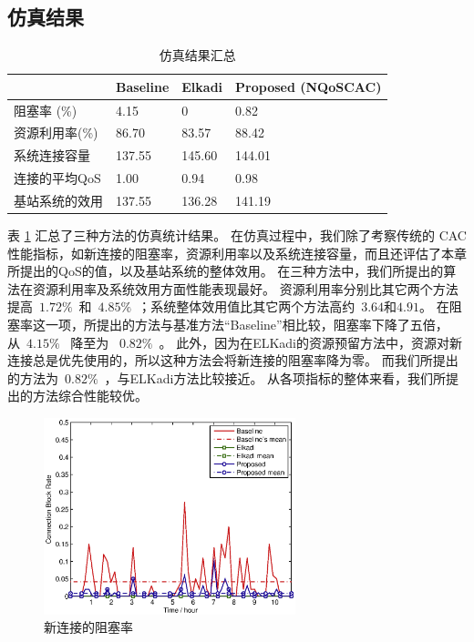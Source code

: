 \subsection{仿真结果} 
%
\begin{table}[htbp] 
\caption{仿真结果汇总} \label{tb:chap_cacop:res_sim}
\begin{center}
\wuhao
\begin{tabularx}{0.99\textwidth}{XXXX}
\toprule
&Baseline &Elkadi &Proposed (NQoSCAC)\\
\midrule
阻塞率 (\%) &4.15 & 0 &0.82\\
资源利用率(\%) &86.70 &83.57 &88.42\\
系统连接容量 &137.55 &145.60 &144.01\\
连接的平均QoS &1.00 &0.94 &0.98\\
基站系统的效用 &137.55 &136.28 &141.19\\
\bottomrule
\end{tabularx}
\end{center}
\end{table}
表 \ref{tb:chap_cacop:res_sim} 汇总了三种方法的仿真统计结果。
在仿真过程中，我们除了考察传统的 CAC 性能指标，如新连接的阻塞率，资源利用率以及系统连接容量，而且还评估了本章所提出的QoS的值，以及基站系统的整体效用。
在三种方法中，我们所提出的算法在资源利用率及系统效用方面性能表现最好。
资源利用率分别比其它两个方法提高~$1.72\%$~和~$4.85\%$~；系统整体效用值比其它两个方法高约~$3.64$和$4.91$。
在阻塞率这一项，所提出的方法与基准方法“Baseline”相比较，阻塞率下降了五倍，从~$4.15\%$~ 降至为 ~$0.82\%$~。
此外，因为在ELKadi的资源预留方法中，资源对新连接总是优先使用的，所以这种方法会将新连接的阻塞率降为零。
而我们所提出的方法为~$0.82\%$~，与ELKadi方法比较接近。
从各项指标的整体来看，我们所提出的方法综合性能较优。
%
\begin{figure}[htbp]
\centering
\includegraphics[width=0.65\textwidth] {cacop_block_rate.eps}
\caption{新连接的阻塞率} \label{fig:chap_cacop:clock_accept_block_drop}
\end{figure}

